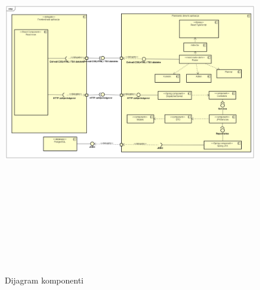 		\begin{figure}[H]
			\includegraphics[scale=0.4, height=170mm, width=165mm]{dijagrami/dijagram-komponenti.png} %
			\centering
			\caption{Dijagram komponenti}
			\label{fig:dijagrami-komponenti.png}
		\end{figure}
		
		\eject